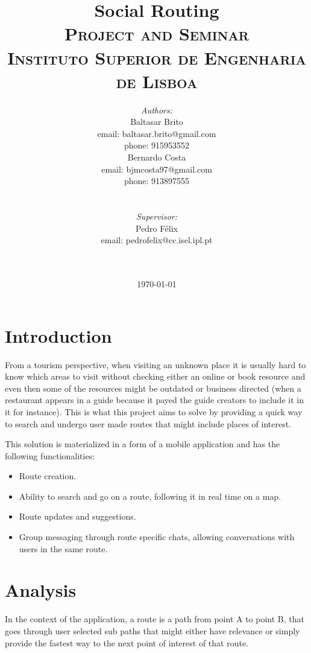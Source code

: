 \documentclass{article}
\title{
    \vspace{-4.0cm}
    {\Huge Social Routing}\\[0.5cm]    
    \textsc{\Large Project and Seminar}\\[0.5cm]
    \textsc{\large Instituto Superior de Engenharia de Lisboa}\\[0.5cm]
}
\date{\today}
\author{   
    \begin{minipage}{0.4\textwidth}
        \begin{flushleft} \large
        \emph{Authors:}\\
        Baltasar Brito\\
        {\small email: baltasar.brito@gmail.com}\\
        {\small phone: 915953552}\\
        Bernardo Costa\\
        {\small email: bjmcosta97@gmail.com}\\
        {\small phone: 913897555}\\
        \end{flushleft}
    \end{minipage}
    ~
    \begin{minipage}{0.4\textwidth}
        \begin{flushright} \large
        \emph{Supervisor:} \\ 
        Pedro Félix\\
        {\small email: pedrofelix@cc.isel.ipl.pt}\\  
        \end{flushright}
    \end{minipage}\\[2cm]  
}
\begin{document}
     
    
    \maketitle
 
    \section{Introduction} 


        From a tourism perspective, when visiting an unknown place it is usually hard to know which areas to visit without 
        checking either an online or book resource and even then some of the resources might be outdated or business directed 
        (when a restaurant appears in a guide because it payed the guide creators to include it in it for instance). 
        This is what this project aims to solve by providing a quick way to search and undergo user made routes that might include places
        of interest.     

        This solution is materialized in a form of a mobile application and has the following functionalities:
        \begin{itemize}
            \item Route creation.
            \item Ability to search and go on a route, following it in real time on a map.
            \item Route updates and suggestions.
            \item Group messaging through route specific chats, allowing conversations with users in the same route.
        \end{itemize}
    

    \newpage
    

    \section{Analysis}

        In the context of the application, a route is a path from point A to point B, that goes through user selected sub paths
        that might either have relevance or simply provide the fastest way to the next point of interest of that route. 
\end{document}
